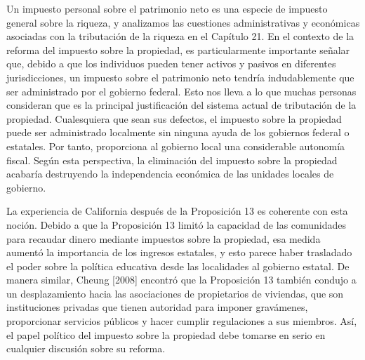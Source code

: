 \documentclass[10pt,a4paper]{article}
\begin{document}
Un impuesto personal sobre el patrimonio neto es una especie de impuesto general sobre la riqueza, y analizamos las cuestiones administrativas y económicas asociadas con la tributación de la riqueza en el Capítulo 21. En el contexto de la reforma del impuesto sobre la propiedad, es particularmente importante señalar que, debido a que los individuos pueden tener activos y pasivos en diferentes jurisdicciones, un impuesto sobre el patrimonio neto tendría indudablemente que ser administrado por el gobierno federal. Esto nos lleva a lo que muchas personas consideran que es la principal justificación del sistema actual de tributación de la propiedad. Cualesquiera que sean sus defectos, el impuesto sobre la propiedad puede ser administrado localmente sin ninguna ayuda de los gobiernos federal o estatales. Por tanto, proporciona al gobierno local una considerable autonomía fiscal. Según esta perspectiva, la eliminación del impuesto sobre la propiedad acabaría destruyendo la independencia económica de las unidades locales de gobierno.

La experiencia de California después de la Proposición 13 es coherente con esta noción. Debido a que la Proposición 13 limitó la capacidad de las comunidades para recaudar dinero mediante impuestos sobre la propiedad, esa medida aumentó la importancia de los ingresos estatales, y esto parece haber trasladado el poder sobre la política educativa desde las localidades al gobierno estatal. De manera similar, Cheung [2008] encontró que la Proposición 13 también condujo a un desplazamiento hacia las asociaciones de propietarios de viviendas, que son instituciones privadas que tienen autoridad para imponer gravámenes, proporcionar servicios públicos y hacer cumplir regulaciones a sus miembros. Así, el papel político del impuesto sobre la propiedad debe tomarse en serio en cualquier discusión sobre su reforma.
\end{document}
